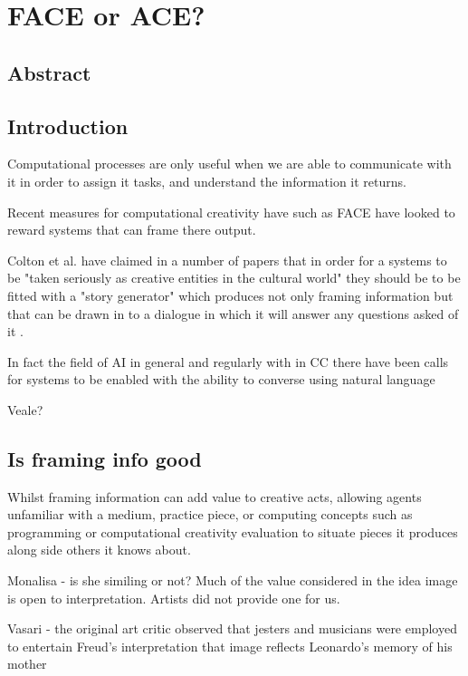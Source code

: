 \documentclass[11pt]{article}
\author{Tristan Strange}
\date{\today}
\title{}
\begin{document}
\tableofcontents

\section{FACE or ACE?}
\label{sec:org6d02e6a}

\subsection{Abstract}
\label{sec:org2d8f6a4}
\subsection{Introduction}
\label{sec:org59af306}

Computational processes are only useful when we are able to communicate with it in order to assign it tasks, and understand the information it returns.

Recent measures for computational creativity have such as FACE have looked to reward systems that can frame there output.

Colton et al. have claimed in a number of papers that in order for a systems to be "taken seriously as creative entities in the cultural world" they should be to be fitted with a "story generator" which produces not only framing information but that can be drawn in to a dialogue in which it will answer any questions asked of it \cite{colton-goodwin-veale:2012} \cite{AlisonPeaseandSimonColton2011}. 

In fact the field of AI in general and regularly with in CC there have been calls for systems to be enabled with the ability to converse using natural language \cite{Baroni2017} 

Veale?

\subsection{Is framing info good}
\label{sec:orgeb819ad}

Whilst framing information can add value to creative acts, allowing agents unfamiliar with a medium, practice piece, or computing concepts such as programming or computational creativity evaluation to situate pieces it produces along side others it knows about.

Monalisa - is she similing or not? 
Much of the value considered in the idea image is open to interpretation. Artists did not provide one for us.

Vasari - the original art critic observed that jesters and musicians were employed to entertain
Freud's interpretation that image reflects Leonardo's memory of his mother \cite{Barolsky1991}
\end{document}
